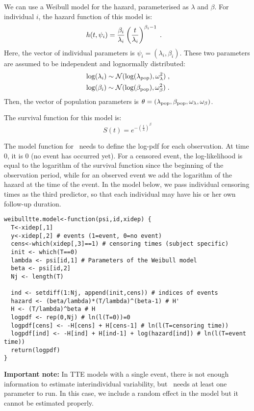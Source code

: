 We can use a Weibull model for the hazard, parameterised as $\lambda$ and $\beta$. For individual $i$, the hazard function of this model is:
\begin{align}\label{weibullmodel}
& h(t, \psi_i) = \frac{\beta_i}{\lambda_i}\left(\frac{t}{\lambda_i}\right)^{\beta_i-1}\;.
\end{align}
Here, the vector of individual parameters is $\psi_i = (\lambda_i, \beta_i)$. These two parameters are assumed to be independent and  lognormally distributed:
\begin{align} \label{indivtte}
& \log(\lambda_i) \sim \mathcal{N}(\log(\lambda_{\rm pop}), \omega^2_{\lambda})\;,\\
& \log(\beta_i) \sim \mathcal{N}(\log(\beta_{\rm pop}), \omega^2_{\beta})\;.
\end{align}
Then, the vector of population parameters is $\theta = (\lambda_{\rm pop}, \beta_{\rm pop}, \omega_{\lambda}, \omega_{\beta})$.

The survival function for this model is:
$$ S(t) = e^{ - \left( \frac{t}{\lambda} \right) ^{\beta}}$$

The model function for \saemix~needs to define the log-pdf for each observation. At time 0, it is 0 (no event has occurred yet). For a censored event, the log-likelihood is equal to the logarithm of the survival function since the beginning of the observation period, while for an observed event we add the logarithm of the hazard at the time of the event. In the model below, we pass individual censoring times as the third predictor, so that each individual may have his or her own follow-up duration.

\begin{verbatim}
weibulltte.model<-function(psi,id,xidep) {
  T<-xidep[,1]
  y<-xidep[,2] # events (1=event, 0=no event)
  cens<-which(xidep[,3]==1) # censoring times (subject specific)
  init <- which(T==0)
  lambda <- psi[id,1] # Parameters of the Weibull model
  beta <- psi[id,2]
  Nj <- length(T)
  
  ind <- setdiff(1:Nj, append(init,cens)) # indices of events
  hazard <- (beta/lambda)*(T/lambda)^(beta-1) # H'
  H <- (T/lambda)^beta # H
  logpdf <- rep(0,Nj) # ln(l(T=0))=0
  logpdf[cens] <- -H[cens] + H[cens-1] # ln(l(T=censoring time))
  logpdf[ind] <- -H[ind] + H[ind-1] + log(hazard[ind]) # ln(l(T=event time))
  return(logpdf)
}
\end{verbatim}


{\bf Important note:} In TTE models with a single event, there is not enough information to estimate interindividual variability, but \saemix~needs at least one parameter to run. In this case, we include a random effect in the model but it cannot be estimated properly.


